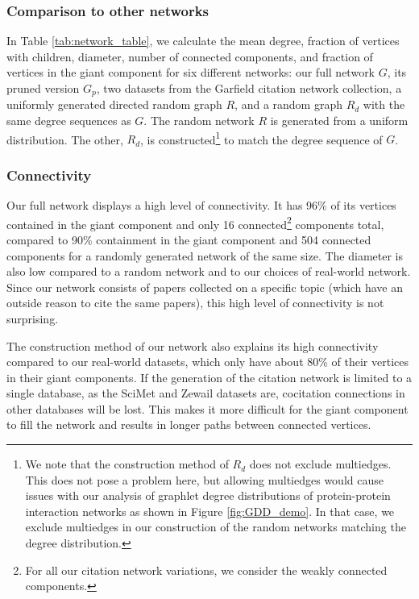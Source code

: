 \documentclass[12pt]{thesis}
\theoremstyle{plain}
\theoremstyle{definition}
\theoremstyle{remark}
\begin{document}
\subsubsection{Comparison to other networks}
In Table \ref{tab:network_table}, we calculate the mean degree, fraction of vertices with children, diameter, number of connected components, and fraction of vertices in the giant component for six different networks: our full network $G$, its pruned version $G_p$, two datasets from the Garfield citation network collection, a uniformly generated directed random graph $R$, and a random graph $R_d$ with the same degree sequences as $G$. The random network $R$ is generated from a uniform distribution. The other, $R_d$, is constructed\footnote{We note that the construction method of $R_d$ does not exclude multiedges. This does not pose a problem here, but allowing multiedges would cause issues with our analysis of graphlet degree distributions of protein-protein interaction networks as shown in Figure \ref{fig:GDD_demo}. In that case, we exclude multiedges in our construction of the random networks matching the degree distribution.} to match the degree sequence of $G$.

\subsubsection{Connectivity}

Our full network displays a high level of connectivity. It has 96\% of its vertices contained in the giant component and only 16 connected\footnote{For all our citation network variations, we consider the weakly connected components.} components total, compared to 90\% containment in the giant component and 504 connected components for a randomly generated network of the same size. The diameter is also low compared to a random network and to our choices of real-world network. Since our network consists of papers collected on a specific topic (which have an outside reason to cite the same papers), this high level of connectivity is not surprising. 

The construction method of our network also explains its high connectivity compared to our real-world datasets, which only have about 80\% of their vertices in their giant components. If the generation of the citation network is limited to a single database, as the SciMet and Zewail datasets are, cocitation connections in other databases will be lost. This makes it more difficult for the giant component to fill the network and results in longer paths between connected vertices.
\end{document}
